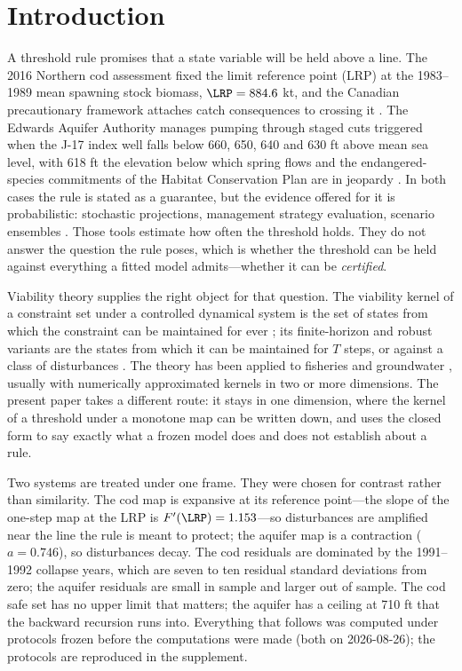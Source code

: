 \section{Introduction}\label{sec:intro}

A threshold rule promises that a state variable will be held above a line. The 2016 Northern cod assessment fixed the limit reference point (LRP) at the 1983--1989 mean spawning stock biomass, $\LRP=884.6$ kt, and the Canadian precautionary framework attaches catch consequences to crossing it \cite{DFO2009,DFO2016}. The Edwards Aquifer Authority manages pumping through staged cuts triggered when the J-17 index well falls below 660, 650, 640 and 630 ft above mean sea level, with 618 ft the elevation below which spring flows and the endangered-species commitments of the Habitat Conservation Plan are in jeopardy \cite{EAA2024,EARIP2021,NRC2015}. In both cases the rule is stated as a guarantee, but the evidence offered for it is probabilistic: stochastic projections, management strategy evaluation, scenario ensembles \cite{Butterworth2007,Punt2016}. Those tools estimate how often the threshold holds. They do not answer the question the rule poses, which is whether the threshold can be held against everything a fitted model admits---whether it can be \emph{certified}.

Viability theory supplies the right object for that question. The viability kernel of a constraint set under a controlled dynamical system is the set of states from which the constraint can be maintained for ever \cite{Aubin1991}; its finite-horizon and robust variants are the states from which it can be maintained for $T$ steps, or against a class of disturbances \cite{BertsekasRhodes1971,RegnierDeLara2015}. The theory has been applied to fisheries and groundwater \cite{Bene2001,Martinet2007,Doyen2012,Krawczyk2013,Pereau2018,Pereau2019,Oubraham2018}, usually with numerically approximated kernels in two or more dimensions. The present paper takes a different route: it stays in one dimension, where the kernel of a threshold under a monotone map can be written down, and uses the closed form to say exactly what a frozen model does and does not establish about a rule.

Two systems are treated under one frame. They were chosen for contrast rather than similarity. The cod map is expansive at its reference point---the slope of the one-step map at the LRP is $F'(\LRP)=1.153$---so disturbances are amplified near the line the rule is meant to protect; the aquifer map is a contraction ($a=0.746$), so disturbances decay. The cod residuals are dominated by the 1991--1992 collapse years, which are seven to ten residual standard deviations from zero; the aquifer residuals are small in sample and larger out of sample. The cod safe set has no upper limit that matters; the aquifer has a ceiling at 710 ft that the backward recursion runs into. Everything that follows was computed under protocols frozen before the computations were made (both on 2026-08-26); the protocols are reproduced in the supplement.


